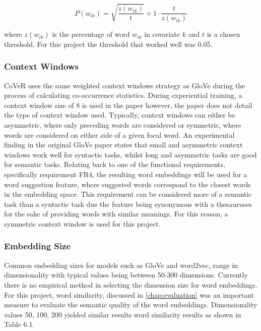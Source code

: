 \begin{equation}
P(w_{ik}) = \sqrt{\dfrac{z(w_{ik})}{t}} + 1 \cdot \dfrac{t}{z(w_{ik})}
\end{equation}

\noindent
\newline
where \(z(w_{ik})\) is the percentage of word \(w_{ik}\) in covariate \(k\) and \(t\) is a chosen threshold. For this project the threshold that worked well was 0.05.
\subsubsection{Context Windows}
CoVeR uses the same weighted context windows strategy as GloVe during the process of calculating co-occurrence statistics. During experiential training, a context window size of 8 is used in the paper however, the paper does not detail the type of context window used. Typically, context windows can either be asymmetric, where only preceding words are considered or symmetric, where words are considered on either side of a given focal word. An experimental finding in the original GloVe paper states that small and asymmetric context windows work well for syntactic tasks, whilst long and asymmetric tasks are good for semantic tasks. Relating back to one of the functional requirements, specifically requirement FR4, the resulting word embeddings will be used for a word suggestion feature, where suggested words correspond to the closest words in the embedding space. This requirement can be considered more of a semantic task than a syntactic task due the feature being synonymous with a thesauruses for the sake of providing words with similar meanings. For this reason, a symmetric context window is used for this project.
\subsubsection{Embedding Size}
Common embedding sizes for models such as GloVe and word2vec, range in dimensionality with typical values being between 50-300 dimensions. Currently there is no empirical method in selecting the dimension size for word embeddings. For this project, word similarity, discussed in \autoref{chap:evaluation} was an important measure to evaluate the semantic quality of the word embeddings. Dimensionality values 50, 100, 200 yielded similar results word similarity results as shown in Table 6.1.

